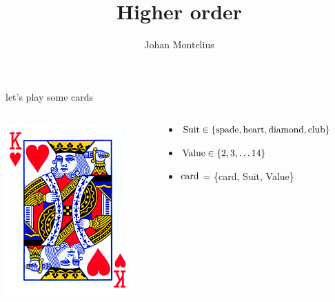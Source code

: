 

\title[ID1019 Higher order]{Higher order}


\author{Johan Montelius}
\date{\semester}



\begin{frame}
\titlepage
\end{frame}

\begin{frame}{let's play some cards}

\begin{columns}

 \begin{column}{0.2\linewidth}
   \includegraphics[width=\linewidth]{kung.png}
 \end{column}
 
 \pause

 \begin{column}{0.8\linewidth}
  \begin{itemize}
   \item ${\rm Suit} \in \{{\rm spade}, {\rm heart}, {\rm diamond}, {\rm club}\}$
   \pause
   \item ${\rm Value} \in \{2,3,\ldots 14\}$
   \pause 
   \item ${\rm card}$ = \{card, Suit, Value\}
  \end{itemize}
 \end{column}
\end{columns}

\end{frame}

